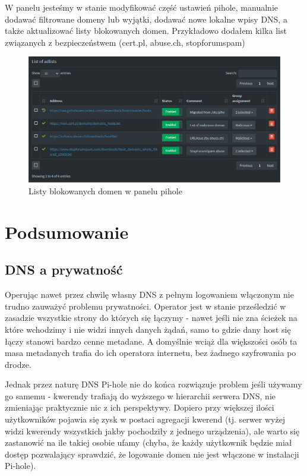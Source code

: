 \documentclass{report}
\numberwithin{equation}{section}
\begin{document}
W panelu jesteśmy w stanie modyfikować część ustawień pihole, manualnie dodawać filtrowane domeny lub wyjątki, dodawać nowe lokalne wpisy DNS, a także aktualizować listy blokowanych domen. Przykładowo dodałem kilka list związanych z bezpieczeństwem (cert.pl, abuse.ch, stopforumspam)
\begin{figure}[H]
    \centering
    \includegraphics[scale=0.6]{pihole-adlists.png}
    \caption{Listy blokowanych domen w panelu pihole}
    \label{fig:pihole_adlists}
\end{figure}

\section{Podsumowanie}
\subsection{DNS a prywatność}
Operując nawet przez chwilę własny DNS z pełnym logowaniem włączonym nie trudno zauważyć problemu prywatności. Operator jest w stanie prześledzić w zasadzie wszystkie strony do których się łączymy - nawet jeśli nie zna ścieżek na które wchodzimy i nie widzi innych danych żądań, samo to gdzie dany host się łączy stanowi bardzo cenne metadane. A domyślnie wciąż dla większości osób ta masa metadanych trafia do ich operatora internetu, bez żadnego szyfrowania po drodze.

Jednak przez naturę DNS Pi-hole nie do końca rozwiązuje problem jeśli używamy go samemu - kwerendy trafiają do wyższego w hierarchii serwera DNS, nie zmieniając praktycznie nic z ich perspektywy. Dopiero przy większej ilości użytkowników pojawia się zysk w postaci agregacji kwerend (tj. serwer wyżej widzi kwerendy wszystkich jakby pochodziły z jednego urządzenia), ale warto się zastanowić na ile takiej osobie ufamy (chyba, że każdy użytkownik będzie miał dostęp pozwalający sprawdzić, że logowanie domen nie jest włączone w instalacji Pi-hole).
\end{document}
